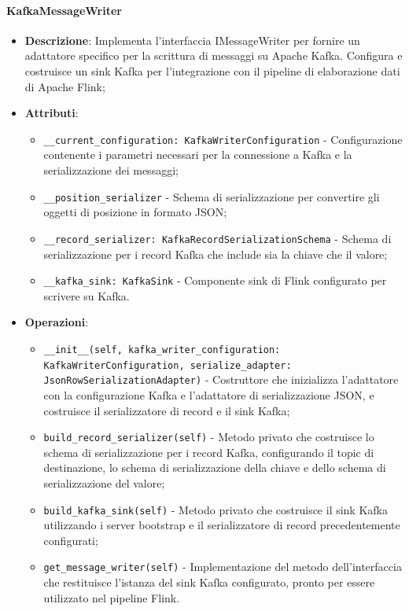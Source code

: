 \documentclass[10pt]{article}
\begin{document}
    \paragraph{KafkaMessageWriter}
    \begin{itemize} 
    \item \textbf{Descrizione}: Implementa l'interfaccia IMessageWriter per fornire un adattatore specifico per la scrittura di messaggi su Apache Kafka. Configura e costruisce un sink Kafka per l'integrazione con il pipeline di elaborazione dati di Apache Flink;
    \item \textbf{Attributi}:
    \begin{itemize}
        \item \texttt{\_\_current\_configuration: KafkaWriterConfiguration} - Configurazione contenente i parametri necessari per la connessione a Kafka e la serializzazione dei messaggi;
        \item \texttt{\_\_position\_serializer} - Schema di serializzazione per convertire gli oggetti di posizione in formato JSON;
        \item \texttt{\_\_record\_serializer: KafkaRecordSerializationSchema} - Schema di serializzazione per i record Kafka che include sia la chiave che il valore;
        \item \texttt{\_\_kafka\_sink: KafkaSink} - Componente sink di Flink configurato per scrivere su Kafka.
    \end{itemize}
    
    \item \textbf{Operazioni}:
    \begin{itemize}
        \item \texttt{\_\_init\_\_(self, kafka\_writer\_configuration: KafkaWriterConfiguration, serialize\_adapter: JsonRowSerializationAdapter)} - Costruttore che inizializza l'adattatore con la configurazione Kafka e l'adattatore di serializzazione JSON, e costruisce il serializzatore di record e il sink Kafka;
        
        \item \texttt{build\_record\_serializer(self)} - Metodo privato che costruisce lo schema di serializzazione per i record Kafka, configurando il topic di destinazione, lo schema di serializzazione della chiave e dello schema di serializzazione del valore;
        
        \item \texttt{build\_kafka\_sink(self)} - Metodo privato che costruisce il sink Kafka utilizzando i server bootstrap e il serializzatore di record precedentemente configurati;
        
        \item \texttt{get\_message\_writer(self)} - Implementazione del metodo dell'interfaccia che restituisce l'istanza del sink Kafka configurato, pronto per essere utilizzato nel pipeline Flink.
    \end{itemize}
    \end{itemize}
\end{document}
